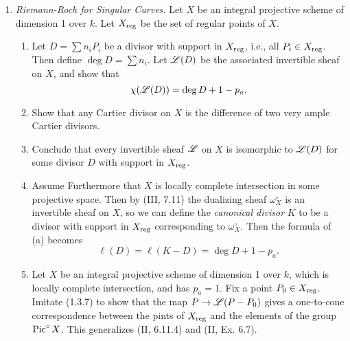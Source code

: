 \documentclass{article}
\begin{document}
\begin{enumerate} [label=\textbf{\arabic*.}, leftmargin=0em]
\item \textit{Riemann-Roch for Singular Curves.} Let $X$ be an integral projective scheme of dimension 1 over $k$. Let $X_{\text{reg}}$ be the set of regular points of $X$.
\begin{enumerate} [label=(\alph*)]
  \item Let $D = \sum n_i P_i$ be a divisor with support in $X_{\text{reg}}$, i.e., all $P_i \in X_{\text{reg}}$. Then define $\deg{D} = \sum n_i$. Let $\mathscr{L}(D)$ be the associated invertible sheaf on $X$, and show that
  \begin{equation*}
    \chi(\mathscr{L}(D)) = \deg{D} + 1 - p_a.
  \end{equation*}
  \item Show that any Cartier divisor on $X$ is the difference of two very ample Cartier divisors.
  \item Conclude that every invertible sheaf $\mathscr{L}$ on $X$ is isomorphic to $\mathscr{L}(D)$ for some divisor $D$ with support in $X_{\text{reg}}$.
  \item Assume Furthermore that $X$ is locally complete intersection in some projective space. Then by (III, 7.11) the dualizing sheaf $\omega_X^\circ$ is an invertible sheaf on $X$, so we can define the \textit{canonical divisor} $K$ to be a divisor with support in $X_{\text{reg}}$ corresponding to $\omega_X^\circ$. Then the formula of (a) becomes
  \begin{equation*}
    \ell(D) = \ell(K - D) = \deg{D} + 1 - p_a.
  \end{equation*}
  \item Let $X$ be an integral projective scheme of dimension 1 over $k$, which is locally complete intersection, and has $p_a = 1$.
  Fix a point $P_0 \in X_{\text{reg}}$.
  Imitate (1.3.7) to show that the map $P \to \mathscr{L}(P - P_0)$ gives a one-to-cone correspondence between the pints of $X_{\text{reg}}$ and the elements of the group $\operatorname{Pic}^\circ{X}$. This generalizes (II, 6.11.4) and (II, Ex. 6.7).
\end{enumerate}

\end{enumerate}
\end{document}
